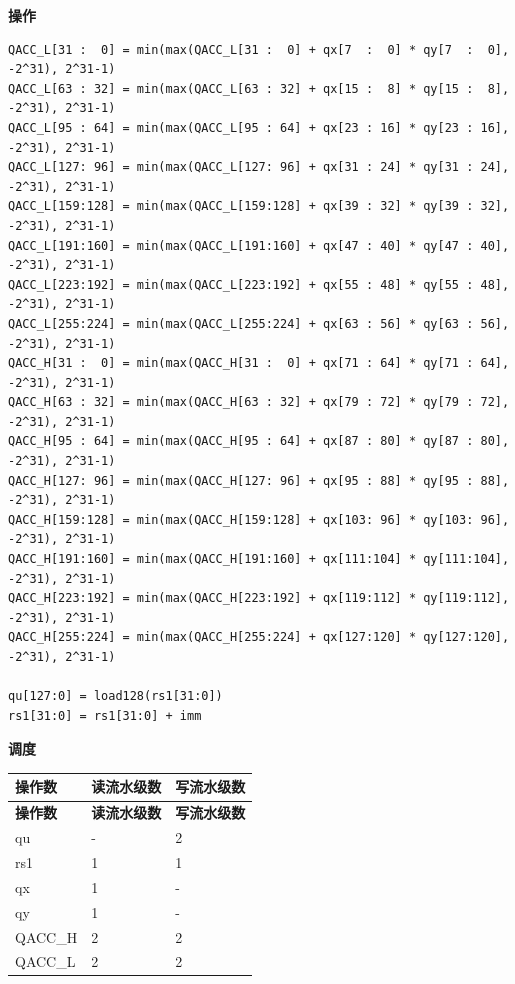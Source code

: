 \textbf{操作}\\
\begin{lstlisting}
QACC_L[31 :  0] = min(max(QACC_L[31 :  0] + qx[7  :  0] * qy[7  :  0], -2^31), 2^31-1)
QACC_L[63 : 32] = min(max(QACC_L[63 : 32] + qx[15 :  8] * qy[15 :  8], -2^31), 2^31-1)
QACC_L[95 : 64] = min(max(QACC_L[95 : 64] + qx[23 : 16] * qy[23 : 16], -2^31), 2^31-1)
QACC_L[127: 96] = min(max(QACC_L[127: 96] + qx[31 : 24] * qy[31 : 24], -2^31), 2^31-1)
QACC_L[159:128] = min(max(QACC_L[159:128] + qx[39 : 32] * qy[39 : 32], -2^31), 2^31-1)
QACC_L[191:160] = min(max(QACC_L[191:160] + qx[47 : 40] * qy[47 : 40], -2^31), 2^31-1)
QACC_L[223:192] = min(max(QACC_L[223:192] + qx[55 : 48] * qy[55 : 48], -2^31), 2^31-1)
QACC_L[255:224] = min(max(QACC_L[255:224] + qx[63 : 56] * qy[63 : 56], -2^31), 2^31-1)
QACC_H[31 :  0] = min(max(QACC_H[31 :  0] + qx[71 : 64] * qy[71 : 64], -2^31), 2^31-1)
QACC_H[63 : 32] = min(max(QACC_H[63 : 32] + qx[79 : 72] * qy[79 : 72], -2^31), 2^31-1)
QACC_H[95 : 64] = min(max(QACC_H[95 : 64] + qx[87 : 80] * qy[87 : 80], -2^31), 2^31-1)
QACC_H[127: 96] = min(max(QACC_H[127: 96] + qx[95 : 88] * qy[95 : 88], -2^31), 2^31-1)
QACC_H[159:128] = min(max(QACC_H[159:128] + qx[103: 96] * qy[103: 96], -2^31), 2^31-1)
QACC_H[191:160] = min(max(QACC_H[191:160] + qx[111:104] * qy[111:104], -2^31), 2^31-1)
QACC_H[223:192] = min(max(QACC_H[223:192] + qx[119:112] * qy[119:112], -2^31), 2^31-1)
QACC_H[255:224] = min(max(QACC_H[255:224] + qx[127:120] * qy[127:120], -2^31), 2^31-1)

qu[127:0] = load128(rs1[31:0])
rs1[31:0] = rs1[31:0] + imm
\end{lstlisting}

\textbf{调度}\\
\begin{longtable}[c]{|l|l|l|}
    \hline
    \rowcolor{lightgray}
    \textbf{操作数} & \textbf{读流水级数} & \textbf{写流水级数} \\\hline
    \endfirsthead
    \hline
    \rowcolor{lightgray}
     \textbf{操作数} & \textbf{读流水级数} & \textbf{写流水级数} \\\hline
    \endhead
    \hline
    \endfoot

    qu & - & 2 \\\hline
    rs1 & 1 & 1 \\\hline
     qx & 1 & - \\\hline
     qy & 1 & - \\\hline
     QACC\_H & 2 & 2 \\\hline
     QACC\_L & 2 & 2

\end{longtable}

